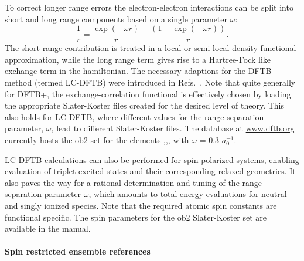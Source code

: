\documentclass[reprint,onecolumn,superscriptaddress]{revtex4-1}
\newcommand{\dftbp}{DFTB+}
\begin{document}
To correct longer range errors the electron-electron interactions can be split
into short and long range components based on a single parameter $\omega$:
\begin{equation}
  \label{range-sep}
  \frac{1}{r} = \frac{\exp(-\omega r)}{r} + \frac{\left(1- \exp(-\omega
    r)\right)}{r}.
\end{equation}
The short range contribution is treated in a local or semi-local density
functional approximation, while the long range term gives rise to a Hartree-Fock
like exchange term in the hamiltonian.\cite{Baer2010} The necessary adaptions
for the DFTB method (termed LC-DFTB) were introduced in
Refs.~\cite{Niehaus2012,Lutsker2015}. Note that quite generally for \dftbp{},
the exchange-correlation functional is effectively chosen by loading the
appropriate Slater-Koster files created for the desired level of theory. This
also holds for LC-DFTB, where different values for the range-separation
parameter, $\omega$, lead to different Slater-Koster files. The database at
\url{www.dftb.org} currently hosts the ob2 set\cite{Vuong2019} for the elements
,,, with $\omega$ = 0.3 $a_0^{-1}$.

LC-DFTB calculations can also be performed for spin-polarized systems, enabling
evaluation of triplet excited states and their corresponding relaxed geometries.
It also paves the way for a rational determination and tuning\cite{Baer2010} of
the range-separation parameter $\omega$, which amounts to total energy
evaluations for neutral and singly ionized species. Note that the required
atomic spin constants are functional specific. The spin parameters for the ob2
Slater-Koster set are available in the manual.


\paragraph{Spin restricted ensemble references}
\end{document}
